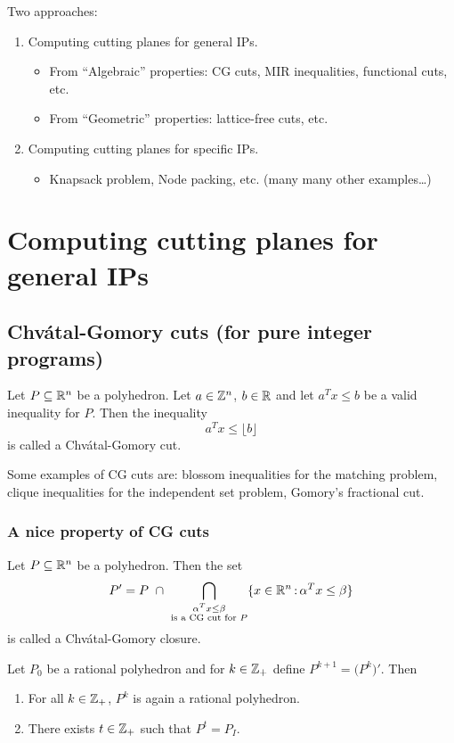 \documentclass[../open-optimization/open-optimization.tex]{subfiles}
\begin{document}
Two approaches:

\begin{enumerate}
	\item Computing cutting planes for general IPs.
	\begin{itemize}
		\item From ``Algebraic'' properties: CG cuts, MIR inequalities, functional cuts, etc.
		\item From ``Geometric'' properties: lattice-free cuts, etc.
	\end{itemize}
	
		\item Computing cutting planes for specific IPs.
	\begin{itemize}
		\item Knapsack problem, Node packing, etc. (many many other examples\dots)
	\end{itemize}
\end{enumerate}



\section{Computing cutting planes for general IPs}
\subsection{Chv\'atal-Gomory cuts (for pure integer programs)}

\begin{definition} Let $P\subseteq{\mathbb{R}}^n$ be a polyhedron. Let $a\in {\mathbb{Z}}^n$, $b\in {\mathbb{R}}$ and let $a^Tx\leq b$ be a valid inequality for $P$. Then the inequality
$$a^Tx\leq \lfloor b\rfloor$$
is called a Chv\'atal-Gomory cut.
\end{definition}
\begin{remark} Some examples of CG cuts are:  blossom inequalities for the matching problem, clique inequalities for the independent set problem, Gomory's fractional cut.
\end{remark}

\subsubsection{A nice property of CG cuts}

\begin{definition} Let $P\subseteq{\mathbb{R}}^n$ be a polyhedron.  Then the set
$$P'=P\ \cap\ \bigcap_{\substack{\alpha^Tx\leq\beta\\ \text{is a CG cut for $P$}}}\{x\in\R^n\tq \alpha^Tx\leq \beta\}$$
is called a Chv\'atal-Gomory closure.
\end{definition}
\begin{theorem}
Let $P_0$ be a rational polyhedron and for $k\in{\mathbb{Z}}_+$ define $P^{k+1}=\big(P^k\big)'$. Then
\begin{enumerate}
	\item For all $k\in{\mathbb{Z}}_+$, $P^k$ is again a rational polyhedron.
	\item There exists $t\in{\mathbb{Z}}_+$ such that $P^t=P_I$.
\end{enumerate}
\end{theorem}
\end{document}
